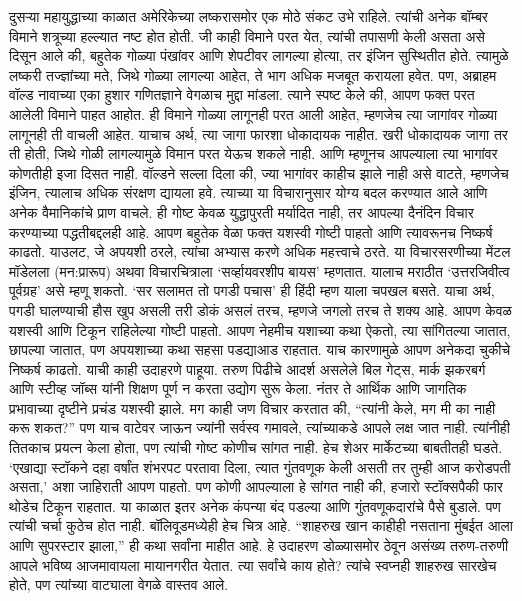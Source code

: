 दुसऱ्या महायुद्धाच्या काळात अमेरिकेच्या लष्करासमोर एक मोठे संकट उभे राहिले. त्यांची अनेक बॉम्बर विमाने शत्रूच्या हल्ल्यात नष्ट होत होती. जी काही विमाने परत येत, त्यांची तपासणी केली असता असे दिसून आले की, बहुतेक गोळ्या पंखांवर आणि शेपटीवर लागल्या होत्या, तर इंजिन सुस्थितीत होते. त्यामुळे लष्करी तज्ज्ञांच्या मते, जिथे गोळ्या लागल्या आहेत, ते भाग अधिक मजबूत करायला हवेत.
पण, अब्राहम वॉल्ड नावाच्या एका हुशार गणितज्ञाने वेगळाच मुद्दा मांडला. त्याने स्पष्ट केले की, आपण फक्त परत आलेली विमाने पाहत आहोत. ही विमाने गोळ्या लागूनही परत आली आहेत, म्हणजेच त्या जागांवर गोळ्या लागूनही ती वाचली आहेत. याचाच अर्थ, त्या जागा फारशा धोकादायक नाहीत. खरी धोकादायक जागा तर ती होती, जिथे गोळी लागल्यामुळे विमान परत येऊच शकले नाही. आणि म्हणूनच आपल्याला त्या भागांवर कोणतीही इजा दिसत नाही. वॉल्डने सल्ला दिला की, ज्या भागांवर काहीच झाले नाही असे वाटते, म्हणजेच इंजिन, त्यालाच अधिक संरक्षण द्यायला हवे. त्याच्या या विचारानुसार योग्य बदल करण्यात आले आणि अनेक वैमानिकांचे प्राण वाचले.
ही गोष्ट केवळ युद्धापुरती मर्यादित नाही, तर आपल्या दैनंदिन विचार करण्याच्या पद्धतीबद्दलही आहे. आपण बहुतेक वेळा फक्त यशस्वी गोष्टी पाहतो आणि त्यावरूनच निष्कर्ष काढतो. याउलट, जे अपयशी ठरले, त्यांचा अभ्यास करणे अधिक महत्त्वाचे ठरते.
या विचारसरणीच्या मेंटल मॉडेलला (मन:प्रारूप) अथवा विचारचित्राला ‘सर्व्हायवरशीप बायस’ म्हणतात. यालाच मराठीत ‘उत्तरजिवीत्व पूर्वग्रह’ असे म्हणू शकतो. ‘सर सलामत तो पगडी पचास’ ही हिंदी म्हण याला चपखल बसते. याचा अर्थ, पगडी घालण्याची हौस खुप असली तरी डोकं असलं तरच, म्हणजे जगलो तरच ते शक्य आहे.  आपण केवळ यशस्वी आणि टिकून राहिलेल्या गोष्टी पाहतो. आपण नेहमीच यशाच्या कथा ऐकतो, त्या सांगितल्या जातात, छापल्या जातात, पण अपयशाच्या कथा सहसा पडद्याआड राहतात. याच कारणामुळे आपण अनेकदा चुकीचे निष्कर्ष काढतो. याची काही उदाहरणे पाहूया.
तरुण पिढीचे आदर्श असलेले बिल गेट्स, मार्क झकरबर्ग आणि स्टीव्ह जॉब्स यांनी शिक्षण पूर्ण न करता उद्योग सुरू केला. नंतर ते आर्थिक आणि जागतिक प्रभावाच्या दृष्टीने प्रचंड यशस्वी झाले. मग काही जण विचार करतात की, “त्यांनी केले, मग मी का नाही करू शकत?” पण याच वाटेवर जाऊन ज्यांनी सर्वस्व गमावले, त्यांच्याकडे आपले लक्ष जात नाही. त्यांनीही तितकाच प्रयत्न केला होता, पण त्यांची गोष्ट कोणीच सांगत नाही.
हेच शेअर मार्केटच्या बाबतीतही घडते. ‘एखाद्या स्टॉकने दहा वर्षांत शंभरपट परतावा दिला, त्यात गुंतवणूक केली असती तर तुम्ही आज करोडपती असता,’ अशा जाहिराती आपण पाहतो. पण कोणी आपल्याला हे सांगत नाही की, हजारो स्टॉक्सपैकी फार थोडेच टिकून राहतात. या काळात इतर अनेक कंपन्या बंद पडल्या आणि गुंतवणूकदारांचे पैसे बुडाले. पण त्यांची चर्चा कुठेच होत नाही.
बॉलिवूडमध्येही हेच चित्र आहे. “शाहरुख खान काहीही नसताना मुंबईत आला आणि सुपरस्टार झाला,” ही कथा सर्वांना माहीत आहे. हे उदाहरण डोळ्यासमोर ठेवून असंख्य तरुण-तरुणी आपले भविष्य आजमावायला मायानगरीत येतात. त्या सर्वांचे काय होते? त्यांचे स्वप्नही शाहरुख सारखेच होते, पण त्यांच्या वाट्याला वेगळे वास्तव आले.
